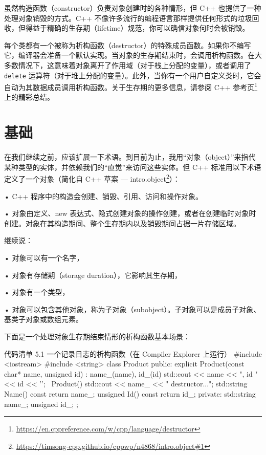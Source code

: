 虽然构造函数（constructor）负责对象创建时的各种情形，但 C++ 也提供了一种处理对象销毁的方式。C++ 不像许多流行的编程语言那样提供任何形式的垃圾回收，但得益于精确的生存期（lifetime）规范，你可以确信对象何时会被销毁。

每个类都有一个被称为析构函数（destructor）的特殊成员函数。如果你不编写它，编译器会准备一个默认实现。当对象的生存期结束时，会调用析构函数。在大多数情况下，这意味着对象离开了作用域（对于栈上分配的变量），或者调用了 \texttt{delete} 运算符（对于堆上分配的变量）。此外，当你有一个用户自定义类时，它会自动为其数据成员调用析构函数。关于生存期的更多信息，请参阅 C++ 参考页\footnote{\url{https://en.cppreference.com/w/cpp/language/destructor}} 上的精彩总结。

\section{基础}

在我们继续之前，应该扩展一下术语。到目前为止，我用“对象（object）”来指代某种类型的实体，并依赖我们的“直觉”来访问这些实体。但 C++ 标准用以下术语定义了一个对象（简化自 C++ 草案 — intro.object\footnote{\url{https://timsong-cpp.github.io/cppwp/n4868/intro.object\#1}}）：

\begin{myQuote}
• C++ 程序中的构造会创建、销毁、引用、访问和操作对象。

• 对象由定义、new 表达式、隐式创建对象的操作创建，或者在创建临时对象时创建。对象在其构造期间、整个生存期内以及销毁期间占据一片存储区域。
\end{myQuote}

继续说：

\begin{myQuote}
• 对象可以有一个名字，

• 对象有存储期（storage duration），它影响其生存期，

• 对象有一个类型，

• 对象可以包含其他对象，称为子对象（subobject）。子对象可以是成员子对象、基类子对象或数组元素。
\end{myQuote}

下面是一个处理对象生存期结束情形的析构函数基本场景：

\begin{codeboxt}[cpp]{代码清单 5.1 一个记录日志的析构函数（在 Compiler Explorer 上运行）}
#include <iostream>
#include <string>
class Product {
public:
explicit Product(const char* name, unsigned id)
: name_(name), id_(id) {
std::cout << name << ", id " << id << '\n';
}
~Product() { std::cout << name_ << " destructor...\n"; }
std::string Name() const { return name_; }
unsigned Id() const { return id_; }
private:
std::string name_;
unsigned id_;
};
\end{codeboxt}

